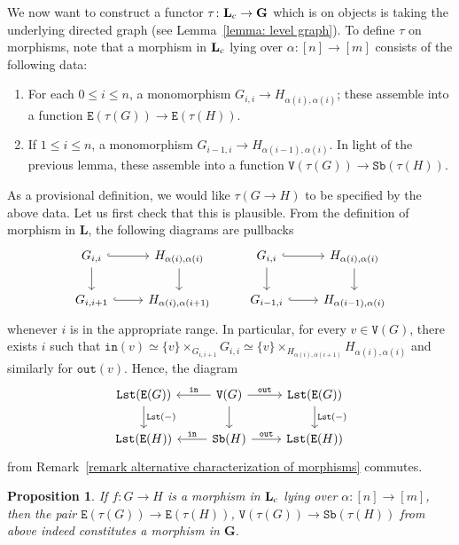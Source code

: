 \documentclass{amsart}
\numberwithin{theorem}{subsection}
\newtheorem{proposition}[theorem]{Proposition}
\theoremstyle{definition}
\newcommand{\name}[1]{\ensuremath{\text{\textup{#1}}}}
\newcommand{\levelg}{\mathbf{L}}
\newcommand{\levelgconn}{\levelg_{\name{c}}}
\newcommand{\bbY}{\mathbf{G}}
\newcommand{\lists}{\mathtt{Lst}}
\newcommand{\sub}{\mathtt{Sb}}
\newcommand{\out}{\mathtt{out}}
\newcommand{\inp}{\mathtt{in}}
\newcommand{\edge}{\mathtt{E}}
\newcommand{\vertex}{\mathtt{V}}
\begin{document}
We now want to construct a functor $\tau\colon \levelgconn\to \bbY$ which is on objects is taking the underlying directed graph (see Lemma~\ref{lemma: level graph}).
To define $\tau$ on morphisms, note that a morphism in $\levelgconn$ lying over $\alpha: [n] \to [m]$ consists of the following data:
\begin{enumerate}
 	\item For each $0 \leq i \leq n$, a monomorphism $G_{i,i} \to H_{\alpha(i), \alpha(i)}$; these assemble into a function $\edge(\tau(G)) \to \edge(\tau(H))$.
 	\item If $1 \leq i \leq n$, a monomorphism $G_{i-1,i} \to  H_{\alpha(i-1), \alpha(i)}$.
In light of the previous lemma, these assemble into a function $\vertex(\tau(G)) \to \sub(\tau(H))$.
\end{enumerate}
As a provisional definition, we would like $\tau(G\to H)$ to be specified by the above data.
Let us first check that this is plausible.
From the definition of morphism in $\levelg$, the following diagrams are pullbacks
\[
\begin{tikzcd}
G_{i,i} \rar[hook] \dar & H_{\alpha(i),\alpha(i)} \dar & G_{i,i} \rar[hook] \dar & H_{\alpha(i),\alpha(i)} \dar \\
G_{i,i+1} \rar[hook] &  H_{\alpha(i),\alpha(i+1)} & G_{i-1,i} \rar[hook] &  H_{\alpha(i-1),\alpha(i)}
\end{tikzcd}
\]
whenever $i$ is in the appropriate range.
In particular, for every $v\in\vertex(G)$, there exists $i$ such that $\inp(v)\simeq \{v\}\times_{G_{i,i+1}} G_{i,i} \simeq \{v\}\times_{H_{\alpha(i),\alpha(i+1)}} H_{\alpha(i),\alpha(i)}$ and similarly for $\out(v)$. Hence, the diagram
\[
\begin{tikzcd}
\lists (\edge(G))  \dar["\lists(-)"] &\vertex(G)  \dar \lar["\inp" swap] \rar["\out"]& \lists (\edge(G))  \dar["\lists(-)"] \\
\lists (\edge(H))  & \sub(H) \lar["\inp" swap] \rar["\out"] & \lists (\edge(H))
\end{tikzcd}
\]
from Remark~\ref{remark alternative characterization of morphisms} commutes.

\begin{proposition}
\label{proposition functor l to y}
If $f\colon G\to H$ is a morphism in $\levelgconn$ lying over $\alpha\colon [n] \to [m]$, then the pair $\edge(\tau(G)) \to \edge(\tau(H))$, $\vertex(\tau(G)) \to \sub(\tau(H))$ from above indeed constitutes a morphism in $\bbY$.
\end{proposition}
\end{document}
